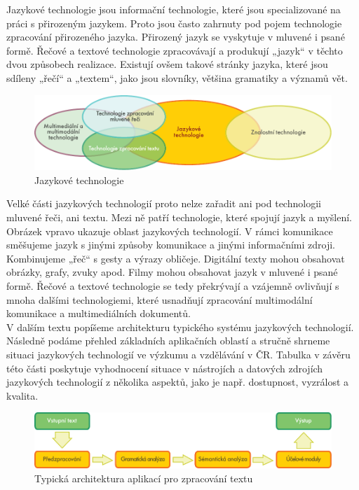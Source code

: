 \begin{multicols}{2}

Jazykové technologie jsou informační technologie, které jsou specializované na práci s přirozeným jazykem. Proto jsou často zahrnuty pod pojem technologie zpracování přirozeného jazyka. Přirozený jazyk se vyskytuje v mluvené i psané formě. Řečové a textové technologie zpracovávají a produkují „jazyk“ v těchto dvou způsobech realizace. Existují ovšem takové stránky jazyka, které jsou sdíleny „řečí“ a „textem“, jako jsou slovníky, většina gramatiky a významů vět. 
\begin{figure}[htb]
  \center
  \includegraphics[width=\textwidth]{../_media/czech/language_technologies}
  \caption{Jazykové technologie}
  \label{fig:ltincontext_en}
\end{figure}
Velké části jazykových technologií proto nelze zařadit ani pod technologii mluvené řeči, ani textu. Mezi ně patří technologie, které spojují jazyk a myšlení. Obrázek vpravo ukazuje oblast jazykových technologií. V rámci komunikace směšujeme jazyk s jinými způsoby komunikace a jinými informačními zdroji. Kombinujeme „řeč“ s gesty a výrazy obličeje. Digitální texty mohou obsahovat obrázky, grafy, zvuky apod. Filmy mohou obsahovat jazyk v mluvené i psané formě. Řečové a textové technologie se tedy překrývají a vzájemně ovlivňují s mnoha dalšími technologiemi, které usnadňují zpracování multimodální komunikace a multimediálních dokumentů.\\
V dalším textu popíšeme architekturu typického systému jazykových technologií. Následně podáme přehled základních aplikačních oblastí a stručně shrneme situaci jazykových technologií ve výzkumu a vzdělávání v ČR. Tabulka v závěru této části poskytuje vyhodnocení situace v nástrojích a datových zdrojích jazykových technologií z několika aspektů, jako je např. dostupnost, vyzrálost a kvalita.
\begin{figure}[b]
  \center
  \includegraphics[width=\textwidth]{../_media/czech/text_processing_app_architecture}
  \caption{Typická architektura aplikací pro zpracování textu}
  \label{fig:textprocessingarch_en}
\end{figure}

\end{multicols}
